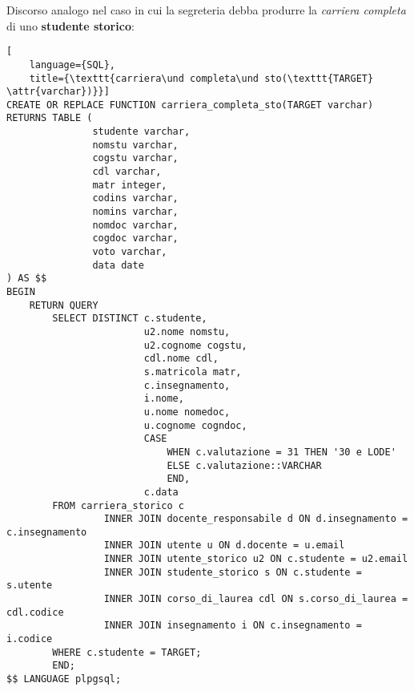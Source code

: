 \documentclass{article}
\newcommand{\attr}[1]{\texttt{\textcolor{gray}{#1}}}
\newcommand{\und}[0]{\textunderscore}
\begin{document}
Discorso analogo nel caso in cui la segreteria debba produrre la \textit{carriera completa} di uno \textbf{studente storico}:

\begin{lstlisting}[
    language={SQL},
    title={\texttt{carriera\und completa\und sto(\texttt{TARGET} \attr{varchar})}}]
CREATE OR REPLACE FUNCTION carriera_completa_sto(TARGET varchar) RETURNS TABLE (
               studente varchar,
               nomstu varchar,
               cogstu varchar,
               cdl varchar,
               matr integer,
               codins varchar,
               nomins varchar,
               nomdoc varchar,
               cogdoc varchar,
               voto varchar,
               data date
) AS $$
BEGIN
    RETURN QUERY
        SELECT DISTINCT c.studente,
                        u2.nome nomstu,
                        u2.cognome cogstu,
                        cdl.nome cdl,
                        s.matricola matr,
                        c.insegnamento,
                        i.nome,
                        u.nome nomedoc,
                        u.cognome cogndoc,
                        CASE
                            WHEN c.valutazione = 31 THEN '30 e LODE'
                            ELSE c.valutazione::VARCHAR
                            END,
                        c.data
        FROM carriera_storico c
                 INNER JOIN docente_responsabile d ON d.insegnamento = c.insegnamento
                 INNER JOIN utente u ON d.docente = u.email
                 INNER JOIN utente_storico u2 ON c.studente = u2.email
                 INNER JOIN studente_storico s ON c.studente = s.utente
                 INNER JOIN corso_di_laurea cdl ON s.corso_di_laurea = cdl.codice
                 INNER JOIN insegnamento i ON c.insegnamento = i.codice
        WHERE c.studente = TARGET;
        END;
$$ LANGUAGE plpgsql;
\end{lstlisting}
\end{document}
